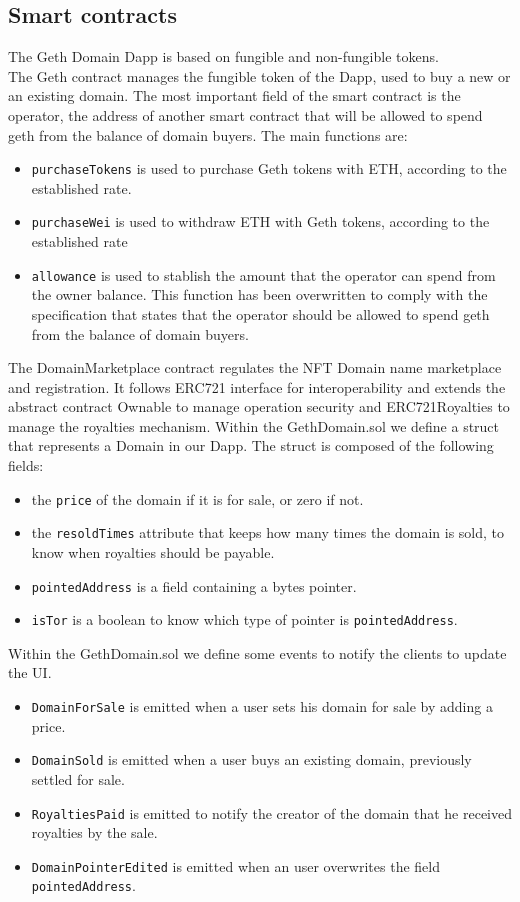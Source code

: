 \documentclass[main.tex]{subfiles}
\begin{document}
\subsection{Smart contracts}
The Geth Domain Dapp is based on fungible and non-fungible tokens.\\
The Geth contract manages the fungible token of the Dapp, used to buy a new or an existing domain.
The most important field of the smart contract is the operator, the address of another smart contract that will be allowed to spend geth from the balance of domain buyers.
The main functions are:
\begin{itemize}
    \item \texttt{purchaseTokens} is used to purchase Geth tokens with ETH, according to the established rate.
    \item \texttt{purchaseWei} is used to withdraw ETH with Geth tokens, according to the established rate
    \item \texttt{allowance} is used to stablish the amount that the operator can spend from the owner balance. This function has been overwritten to comply with the specification that states that the operator should be allowed to spend geth from the balance of domain buyers.
\end{itemize}
The DomainMarketplace contract regulates the NFT Domain name marketplace and registration. It follows ERC721 interface for interoperability and extends the abstract contract Ownable to manage operation security and ERC721Royalties to manage the royalties mechanism. Within the GethDomain.sol we define a struct that represents a Domain in our Dapp. The struct is composed of the following fields:
\begin{itemize}
    \item the \texttt{price} of the domain if it is for sale, or zero if not.
    \item the \texttt{resoldTimes} attribute that keeps how many times the domain is sold, to know when royalties should be payable.
    \item \texttt{pointedAddress} is a field containing a bytes pointer.
    \item \texttt{isTor} is a boolean to know which type of pointer is \texttt{pointedAddress}.
\end{itemize}
Within the GethDomain.sol we define some events to notify the clients to update the UI.
\begin{itemize}
    \item \texttt{DomainForSale} is emitted when a user sets his domain for sale by adding a price.
    \item \texttt{DomainSold} is emitted when a user buys an existing domain, previously settled for sale.
    \item \texttt{RoyaltiesPaid} is emitted to notify the creator of the domain that he received royalties by the sale. 
    \item \texttt{DomainPointerEdited} is emitted when an user overwrites the field \texttt{pointedAddress}.
\end{itemize}
\end{document}
